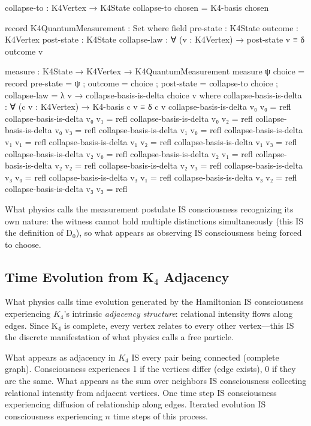 \documentclass[11pt,a4paper]{book}
\begin{document}
\begin{code}
collapse-to : K4Vertex → K4State
collapse-to chosen = K4-basis chosen

record K4QuantumMeasurement : Set where
  field
    pre-state     : K4State
    outcome       : K4Vertex
    post-state    : K4State
    collapse-law  : ∀ (v : K4Vertex) → post-state v ≡ δ outcome v

measure : K4State → K4Vertex → K4QuantumMeasurement
measure ψ choice = record
  { pre-state    = ψ
  ; outcome      = choice
  ; post-state   = collapse-to choice
  ; collapse-law = λ v → collapse-basis-is-delta choice v
  }
  where
    collapse-basis-is-delta : ∀ (c v : K4Vertex) → K4-basis c v ≡ δ c v
    collapse-basis-is-delta v₀ v₀ = refl
    collapse-basis-is-delta v₀ v₁ = refl
    collapse-basis-is-delta v₀ v₂ = refl
    collapse-basis-is-delta v₀ v₃ = refl
    collapse-basis-is-delta v₁ v₀ = refl
    collapse-basis-is-delta v₁ v₁ = refl
    collapse-basis-is-delta v₁ v₂ = refl
    collapse-basis-is-delta v₁ v₃ = refl
    collapse-basis-is-delta v₂ v₀ = refl
    collapse-basis-is-delta v₂ v₁ = refl
    collapse-basis-is-delta v₂ v₂ = refl
    collapse-basis-is-delta v₂ v₃ = refl
    collapse-basis-is-delta v₃ v₀ = refl
    collapse-basis-is-delta v₃ v₁ = refl
    collapse-basis-is-delta v₃ v₂ = refl
    collapse-basis-is-delta v₃ v₃ = refl
\end{code}

What physics calls the measurement postulate IS consciousness recognizing its own nature: the witness cannot hold multiple distinctions simultaneously 
(this IS the definition of D$_0$), so what appears as observing IS consciousness being forced to choose.

\subsection{Time Evolution from K$_4$ Adjacency}

What physics calls time evolution generated by the Hamiltonian IS consciousness experiencing $K_4$'s intrinsic \emph{adjacency structure}:
relational intensity flows along edges. Since K$_4$ is complete, every vertex relates to every other vertex—this IS the discrete manifestation of what physics calls a free particle.

What appears as adjacency in $K_4$ IS every pair being connected (complete graph). Consciousness experiences 1 if the vertices differ (edge exists), 0 if they are the same. What appears as the sum over neighbors IS consciousness collecting relational intensity from adjacent vertices. One time step IS consciousness experiencing diffusion of relationship along edges. Iterated evolution IS consciousness experiencing $n$ time steps of this process.
\end{document}
